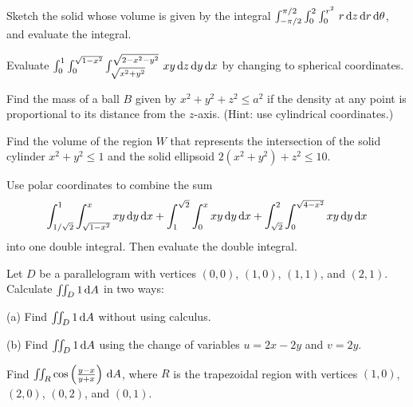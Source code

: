 \documentclass[prettycode,shellescape]{watsonbook}
\begin{document}
\begin{aexercise}
  Sketch the solid whose volume is given by the integral
  $\int_{-\pi/2}^{\pi/2} \int_0^2 \int_0^{r^2} \, r\,\mathrm{d} z\,\mathrm{d} r\,\mathrm{d}\theta$,
  and evaluate the integral.
\end{aexercise}

\begin{aexercise}
  Evaluate
  $\int_0^1 \int_0^{\sqrt{1-x^2}}
  \int_{\sqrt{x^2+y^2}}^{\sqrt{2-x^2-y^2}} \, xy \, {\mathrm{d}}z \, \mathrm{d} y \, \mathrm{d} x$ by
  changing to spherical coordinates.
\end{aexercise}

\begin{aexercise}
  Find the mass of a ball $B$ given by $x^2+y^2+z^2 \leq a^2$ if the
  density at any point is proportional to its distance from the
  $z$-axis. (Hint: use cylindrical coordinates.)
\end{aexercise}


\begin{aexercise}
  Find the volume of the region $W$ that represents the intersection
  of the solid cylinder $x^2+y^2 \leq 1$ and the solid ellipsoid
  $2(x^2+y^2)+z^2\leq 10.$
\end{aexercise}

\begin{aexercise}
  Use polar coordinates to combine the sum 
  \[
    \int_{1/\sqrt{2}}^1\int_{\sqrt{1-x^2}}^x xy \, \mathrm{d} y \, \mathrm{d} x + 
    \int_{1}^{\sqrt{2}} \int_0^x xy \,\mathrm{d} y \,\mathrm{d} x + 
    \int_{\sqrt{2}}^2 \int_0^{\sqrt{4-x^2}} xy \,\mathrm{d} y \, \mathrm{d} x
  \]
  into one double integral. Then evaluate the double integral.
\end{aexercise}


\begin{aexercise}
  Let $D$ be a parallelogram with vertices $(0,0)$, $(1,0)$, $(1,1)$,
  and $(2,1)$. Calculate $\iint_D 1\,\mathrm{d} A$ in two ways:

  (a) Find $\iint_D 1\,\mathrm{d} A$ without using calculus.

  (b) Find $\iint_D 1\,\mathrm{d} A$ using the change of variables $u = 2x - 2y$
  and $v=2y$.
\end{aexercise}

\begin{aexercise}
  Find
  $\iint_R \cos \left(\frac{y-x}{y+x}\right) \, {\mathrm{d}}A$, where $R$ is the
  trapezoidal region with vertices $(1,0)$, $(2,0)$, $(0,2)$, and
  $(0,1)$.
\end{aexercise}
\end{document}
